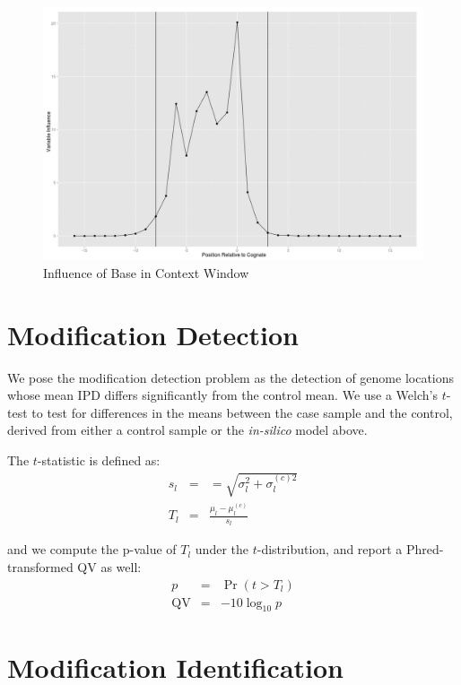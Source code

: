 \documentclass[pdftex]{article}
\begin{document}
\begin{figure}
\begin{center}\includegraphics[width=5in]{position-influence.png}\end{center}
\caption{ Influence of Base in Context Window }
\label{fig:position-influence}
\end{figure}


\section{Modification Detection}
We pose the modification detection problem as the detection of genome locations whose mean IPD differs significantly from the control mean. We use a Welch's $t$-test to test for differences in the means between the case sample and the control, derived from either a control sample or the \emph{in-silico} model above.

The $t$-statistic is defined as:
\begin{eqnarray}
s_l & = & = \sqrt{ \sigma_l^2 + \sigma_l^{(c)2}} \\
T_l & = &\frac{\mu_l - \mu_l^{(c)}}{s_l} 
\end{eqnarray}

and we compute the p-value of $T_l$ under the $t$-distribution, and report a Phred-transformed QV as well:
\begin{eqnarray}
p & = & \Pr(t > T_l) \\
\mathrm{QV} & = & -10 \log_{10} p
\end{eqnarray}


\section{ Modification Identification } 
\end{document}
